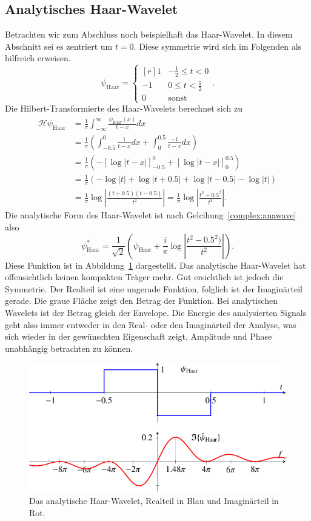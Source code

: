 \subsection{Analytisches Haar-Wavelet}
Betrachten wir zum Abschluss noch beispielhaft das Haar-Wavelet.
In diesem Abschnitt sei es zentriert um $t=0$.
Diese symmetrie wird sich im Folgenden als hilfreich erweisen.
\[
	\psi_{\text{Haar}} = \left\lbrace\begin{matrix*}[r]
		1 & -\frac{1}{2} \le t < 0  \\
		-1 & 0 \le t < \frac{1}{2} \\
		0 & \text{sonst}
	\end{matrix*} \right..
\]
Die Hilbert-Transformierte des Haar-Wavelets berechnet sich zu
\begin{align*}
	\mathcal{H} \psi_{\text{Haar}}
	&= \frac{1}{\pi} \int_{-\infty}^{\infty} \frac{\psi_{\text{Haar}}(x)}{t-x} dx\\
	&= \frac{1}{\pi}\left( \int_{-0.5}^{0} \frac{1}{t-x}dx + \int_{0}^{0.5} \frac{-1}{t-x}dx \right)\\
	&= \frac{1}{\pi} \left( -\left[\log \left|t-x\right| \right]_{-0.5}^{0} + \left[\log\left|t-x\right| \right]_{0}^{0.5} \right)\\
	&= \frac{1}{\pi} \left( -\log\left|t\right| + \log\left|t+0.5\right| + \log\left|t-0.5\right| - \log\left|t\right|\right)\\
	&= \frac{1}{\pi} \log\left|\frac{(t+0.5)(t-0.5)}{t^2}\right|
	= \frac{1}{\pi} \log\left|\frac{t^2-0.5^2}{t^2}\right|.
\end{align*}
Die analytische Form des Haar-Wavelet ist nach Gelcihung~\eqref{complex:anawave} also
\[
 \psi^\ast_{\text{Haar}} = \frac{1}{\sqrt{2}}\left(\psi_{\text{Haar}} + \frac{i}{\pi} \log\left|\frac{t^2-0.5^2)}{t^2}\right|\right).
\]
Diese Funktion ist in Abbildung~\ref{complex:haar} dargestellt.
Das analytische Haar-Wavelet hat offensichtlich keinen kompakten Träger mehr.
Gut ersichtlich ist jedoch die Symmetrie.
Der Realteil ist eine ungerade Funktion, folglich ist der Imaginärteil gerade.
Die graue Fläche zeigt den Betrag der Funktion.
Bei analytischen Wavelets ist der Betrag gleich der Envelope.
Die Energie des analysierten Signals geht also immer entweder in den Real- oder den Imaginärteil der Analyse, was sich wieder in der gewünschten Eigenschaft zeigt, Amplitude und Phase unabhängig betrachten zu können.

\begin{figure}
	\centering
	\includegraphics{papers/complex/images/haar.pdf}
	\caption{Das analytische Haar-Wavelet, Realteil in Blau und Imaginärteil in Rot. \label{complex:haar}}
\end{figure}